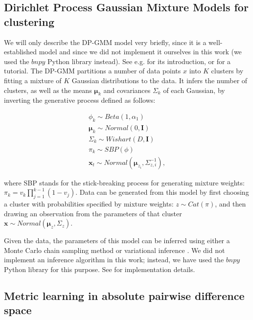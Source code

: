 \subsection{Dirichlet Process Gaussian Mixture Models for clustering}

We will only describe the DP-GMM model very briefly, since it is a well-established model and since we did not implement it ourselves in this work (we used the $bnpy$ Python library instead). See e.g. \citep{rasmussen1999infinite} for its introduction, or \citep{gershman2012tutorial} for a tutorial. The DP-GMM partitions a number of data points $x$ into $K$ clusters by fitting a mixture of $K$ Gaussian distributions to the data. It infers the number of clusters, as well as the means $\bm \mu_k$ and covariances $\Sigma_k$ of each Gaussian, by inverting the generative process defined as follows:
 
\begin{equation}
\label{eq:dpgmm}
\begin{array}{rcl}
\phi_k   \sim Beta(1, \alpha_1) \\
\bm \mu_k    \sim Normal(0,  \mathbf{I}) \\
\Sigma_k \sim Wishart(D, \mathbf{I}) \\
\pi_{k}  \sim SBP(\phi) \\
\bm x_t \sim Normal(\bm \mu_{z_i},  \Sigma_{z,i}^{-1}),
\end{array}
\end{equation}

\noindent where SBP stands for the stick-breaking process for generating mixture weights: $\pi_k=v_k \prod_{j=1}^{k-1} (1-v_j)$. Data can be generated from this model by first choosing a cluster with probabilities specified by mixture weights: $z \sim Cat(\pi)$, and then drawing an observation from the parameters of that cluster $\bm x \sim Normal(\bm \mu_z, \Sigma_z)$.

Given the data, the parameters of this model can be inferred using either a Monte Carlo chain sampling method \citep{neal2000markov} or variational inference \citep{blei2006variational}. We did not implement an inference algorithm in this work; instead, we have used the $bnpy$ Python library for this purpose. See \citep{hughes2013memoized} for implementation details.

\subsection{Metric learning in absolute pairwise difference space}


